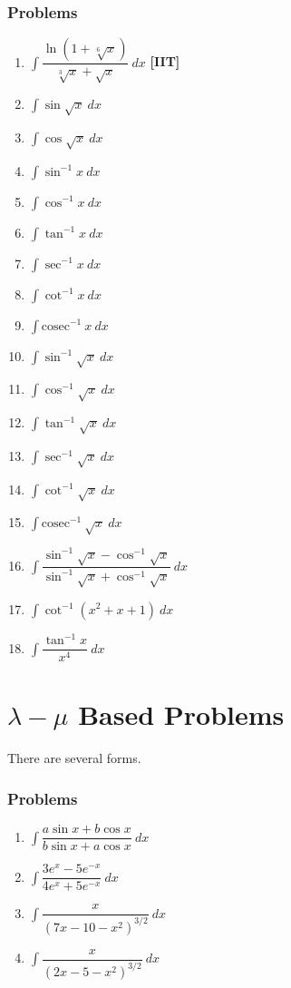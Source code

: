 \documentclass[12pt,a4paper,twoside]{book}
\newcommand{\dint}[1]{\displaystyle{\int #1 \  dx}}
\newcommand{\coseci}[1]{\displaystyle{\text{cosec}^{-1}\ #1}}
\begin{document}
	\subsubsection{Problems}
	\begin{multicols}{2}
	\begin{enumerate}
	\item $\dint{\dfrac{\ln(1+\sqrt[6]{x})}{\sqrt[3]{x}+\sqrt{x}}}$ \hfill\textbf{[IIT]}
	\item $\dint{\sin{\sqrt{x}}}$
	\item $\dint{\cos{\sqrt{x}}}$
	\item $\dint{\sin^{-1}{x}}$
	\item $\dint{\cos^{-1}{x}}$
	\item $\dint{\tan^{-1}{x}}$
	\item $\dint{\sec^{-1}{x}}$
	\item $\dint{\cot^{-1}{x}}$
	\item $\dint{\coseci{x}}$
	\item $\dint{\sin^{-1}{\sqrt x}}$
	\item $\dint{\cos^{-1}{\sqrt x}}$
	\item $\dint{\tan^{-1}{\sqrt x}}$
	\item $\dint{\sec^{-1}{\sqrt x}}$
	\item $\dint{\cot^{-1}{\sqrt x}}$
	\item $\dint{\coseci{\sqrt x}}$
	\item $\dint{\dfrac{\sin^{-1}{\sqrt x} -\cos^{-1}{\sqrt x}}{\sin^{-1}{\sqrt x}+\cos^{-1}{\sqrt x}}}$
	\item $\dint{\cot^{-1}{(x^2+x+1)}}$
	\item $\dint{\dfrac{\tan^{-1}x}{x^4}}$
	\end{enumerate}
	\end{multicols}
\section{$\lambda-\mu$ Based Problems}
	There are several forms. 
	\subsubsection{Problems}
	\begin{multicols}{2}
	\begin{enumerate}
	\item $\dint{\dfrac{a\sin x+ b\cos x}{b\sin x+ a\cos x}}$
	\item $\dint{\dfrac{3e^x-5e^{-x}}{4e^x+5e^{-x}}}$
	\item $\dint{\dfrac{x}{(7x-10-x^2)^{3/2}}}$
	\item $\dint{\dfrac{x}{(2x-5-x^2)^{3/2}}}$
	\end{enumerate}
	\end{multicols}
\end{document}
